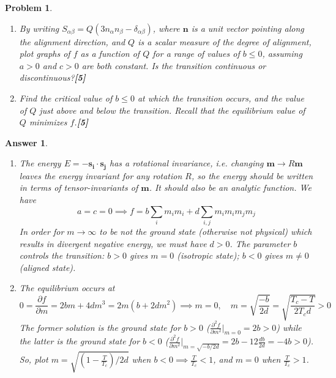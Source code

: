\documentclass[a4paper]{article}
\DeclareMathOperator{\Tr}{Tr}
\newtheorem{ans}{Answer}[section]
\theoremstyle{new}
\newtheorem{qns}{Problem}[section]
\begin{document}
\begin{qns}
\begin{enumerate}[label=(\alph*)]
$$f=a\Tr(S\cdot S)+b\Tr(S\cdot S\cdot S)+c\Tr(S\cdot S\cdot S\cdot S)$$
\item By writing $S_{\alpha\beta}=Q(3n_\alpha n_\beta-\delta_{\alpha\beta})$, where $\mathbf{n}$ is a unit vector pointing along the alignment direction, and $Q$ is a scalar measure of the degree of alignment, plot graphs of $f$ as a function of $Q$ for a range of values of $b\leq 0$, assuming $a > 0$ and $c > 0$ are both constant. Is the transition continuous or discontinuous?\hfill\textbf{[5]}
\item Find the critical value of $b\leq 0$ at which the transition occurs, and the value of $Q$ just above and below the transition. Recall that the equilibrium value of $Q$ minimizes $f$.\hfill\textbf{[5]}
\end{enumerate}
\end{qns}
\begin{ans}\leavevmode
\begin{enumerate}[label=(\alph*)]
\item The energy $E=-\mathbf{s_i}\cdot\mathbf{s_j}$ has a rotational invariance, i.e. changing $\mathbf{m}\rightarrow R\mathbf{m}$ leaves the energy invariant for any rotation $R$, so the energy should be written in terms of tensor-invariants of $\mathbf{m}$. It should also be an analytic function. We have
$$a=c=0\implies f=b\sum_im_im_i+d\sum_{i,j}m_im_im_jm_j$$
In order for $m\rightarrow\infty$ to be not the ground state (otherwise not physical) which results in divergent negative energy, we must have $d>0$. The parameter $b$ controls the transition: $b>0$ gives $m=0$ (isotropic state); $b<0$ gives $m\neq 0$ (aligned state).
\item The equilibrium occurs at
$$0=\frac{\partial f}{\partial m}=2bm+4dm^3=2m(b+2dm^2)\implies m=0,\quad m=\sqrt{\frac{-b}{2d}}=\sqrt{\frac{T_c-T}{2T_cd}}>0$$
The former solution is the ground state for $b>0$ ($\frac{\partial^2f}{\partial m^2}|_{m=0}=2b>0$) while the latter is the ground state for $b<0$ ($\frac{\partial^2f}{\partial m^2}|_{m=\sqrt{-b/2d}}=2b-12\frac{db}{2d}=-4b>0$). So, plot $m=\sqrt{(1-\frac{T}{T_c})/2d}$ when $b<0\implies\frac{T}{T_c}<1$, and $m=0$ when $\frac{T}{T_c}>1$.
\begin{center}
\end{center}
\end{enumerate}
\end{ans}
\end{document}
